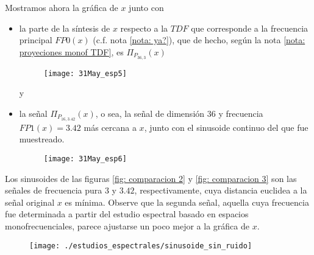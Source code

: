 \begin{ejemplo}
Mostramos ahora la gráfica de $x$ junto con
\begin{itemize}
	\item la parte de la síntesis de $x$ respecto a la $TDF$
	que corresponde a la frecuencia principal
	$FP0(x)$ (c.f.
	nota \ref{nota: ya?}), que de hecho,
	según la nota \ref{nota: proyeciones monof TDF}, es
	$\Pi_{P_{36,3}}(x)$
	\begin{figure}[H]
			\centering
			\texttt{[image: 31May\_esp5]} 
		\end{figure}		
	
	y
	\item la señal $\Pi_{P_{16, 3.42}}(x)$, o sea, la señal de
	dimensión $36$ y frecuencia $FP1(x)=3.42$ más cercana a $x$, junto con
	el sinusoide continuo del que fue muestreado.
	\begin{figure}[H]
			\centering
			\texttt{[image: 31May\_esp6]} 
		\end{figure}		
\end{itemize}


Los sinusoides de las figuras \ref{fig: comparacion 2} y
\ref{fig: comparacion 3}
son las señales de frecuencia pura
$3$ y $3.42$, respectivamente, cuya distancia euclidea
a la señal original $x$ es mínima. Observe que la segunda
señal, aquella cuya frecuencia
fue determinada
a partir del estudio espectral basado en espacios
monofrecuenciales,
parece ajustarse un poco mejor a la gráfica de $x$. \\

\begin{figure}[H]
			\centering
			\texttt{[image: ./estudios\_espectrales/sinusoide\_sin\_ruido]} 
		\end{figure}		




\end{ejemplo}
